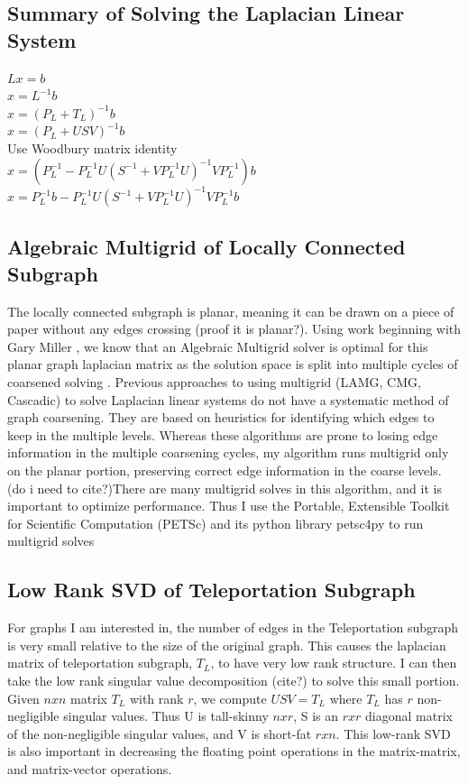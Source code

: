 \documentclass{article}
\begin{document}
\subsection{Summary of Solving the Laplacian Linear System}
\begin{center}
$Lx=b$\\
$x = L^{-1}b$\\
$x = (P_L+T_L)^{-1}b$\\
$x = (P_L+USV)^{-1}b$\\
Use Woodbury matrix identity\\
$x = (P_L^{-1}-P_L^{-1}U(S^{-1}+VP_L^{-1}U)^{-1}VP_L^{-1})b$\\
$x = P_L^{-1}b-P_L^{-1}U(S^{-1}+VP_L^{-1}U)^{-1}VP_L^{-1}b$\\
\end{center}


\subsection{Algebraic Multigrid of Locally Connected Subgraph}
The locally connected subgraph is planar, meaning it can be drawn on a piece of paper without any edges crossing (proof it is planar?). Using work beginning with Gary Miller \cite{Miller:1995}, we know that an Algebraic Multigrid solver is optimal for this planar graph laplacian matrix as the solution space is split into multiple cycles of coarsened solving \cite{Brandt:1984}. Previous approaches to using multigrid (LAMG, CMG, Cascadic) to solve Laplacian linear systems do not have a systematic method of graph coarsening. They are based on heuristics for identifying which edges to keep in the multiple levels. Whereas these algorithms are prone to losing edge information in the multiple coarsening cycles, my algorithm runs multigrid only on the planar portion, preserving correct edge information in the coarse levels. (do i need to cite?)There are many multigrid solves in this algorithm, and it is important to optimize performance. Thus I use the Portable, Extensible Toolkit for Scientific Computation (PETSc) and its python library petsc4py to run multigrid solves \cite{petsc-user-ref, Dalcin:2011}

\subsection{Low Rank SVD of Teleportation Subgraph}
For graphs I am interested in, the number of edges in the Teleportation subgraph is very small relative to the size of the original graph. This causes the laplacian matrix of teleportation subgraph, $T_L$, to have very low rank structure. I can then take the low rank singular value decomposition (cite?) to solve this small portion. Given $nxn$ matrix $T_L$ with rank $r$, we compute $USV = T_L$ where $T_L$ has $r$ non-negligible singular values. Thus U is tall-skinny $nxr$, S is an $rxr$ diagonal matrix of the non-negligible singular values, and V is short-fat $rxn$. This low-rank SVD is also important in decreasing the floating point operations in the matrix-matrix, and matrix-vector operations.











\end{document}
